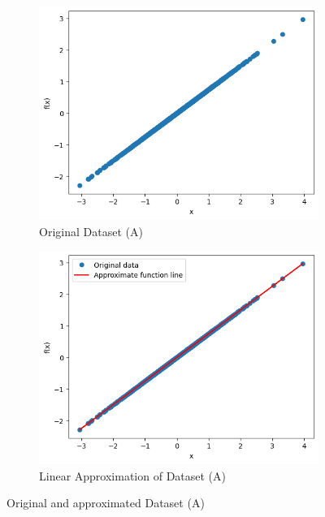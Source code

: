 \begin{itemize}
\begin{figure}[H]
    \centering
    \begin{subfigure}{0.4\textwidth}
        \centering
        \includegraphics[width=\linewidth]{images/ex5task1_1Original.png}
        \caption{Original Dataset (A)}
        \label{task5_1Original}
    \end{subfigure}
    \begin{subfigure}{0.4\textwidth}
    \centering
        \includegraphics[width=\linewidth]{images/ex5task1_1Approximated.png}
        \caption{Linear Approximation of Dataset (A)}
        \label{task5_1Approximated}
    \end{subfigure}
    \caption{Original and approximated Dataset (A)}
    \label{task5_1_1}
\end{figure}


\end{itemize}
